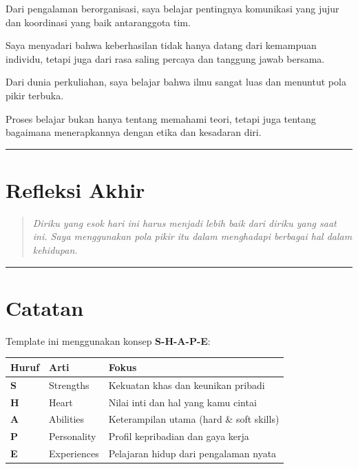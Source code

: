 \documentclass[
  letterpaper,
  DIV=11,
  numbers=noendperiod]{scrreprt}
\begin{document}

Dari pengalaman berorganisasi, saya belajar pentingnya komunikasi yang
jujur dan koordinasi yang baik antaranggota tim.

Saya menyadari bahwa keberhasilan tidak hanya datang dari kemampuan
individu, tetapi juga dari rasa saling percaya dan tanggung jawab
bersama.

Dari dunia perkuliahan, saya belajar bahwa ilmu sangat luas dan menuntut
pola pikir terbuka.

Proses belajar bukan hanya tentang memahami teori, tetapi juga tentang
bagaimana menerapkannya dengan etika dan kesadaran diri.

\begin{center}\rule{0.5\linewidth}{0.5pt}\end{center}

\section{Refleksi Akhir}\label{refleksi-akhir}

\begin{quote}
\emph{Diriku yang esok hari ini harus menjadi lebih baik dari diriku
yang saat ini. Saya menggunakan pola pikir itu dalam menghadapi berbagai
hal dalam kehidupan.}
\end{quote}

\begin{center}\rule{0.5\linewidth}{0.5pt}\end{center}

\section{Catatan}\label{catatan}

Template ini menggunakan konsep \textbf{S-H-A-P-E}:

\begin{longtable}[]{@{}lll@{}}
\toprule\noalign{}
Huruf & Arti & Fokus \\
\midrule\noalign{}
\endhead
\bottomrule\noalign{}
\endlastfoot
\textbf{S} & Strengths & Kekuatan khas dan keunikan pribadi \\
\textbf{H} & Heart & Nilai inti dan hal yang kamu cintai \\
\textbf{A} & Abilities & Keterampilan utama (hard \& soft skills) \\
\textbf{P} & Personality & Profil kepribadian dan gaya kerja \\
\textbf{E} & Experiences & Pelajaran hidup dari pengalaman nyata \\
\end{longtable}
\end{document}
